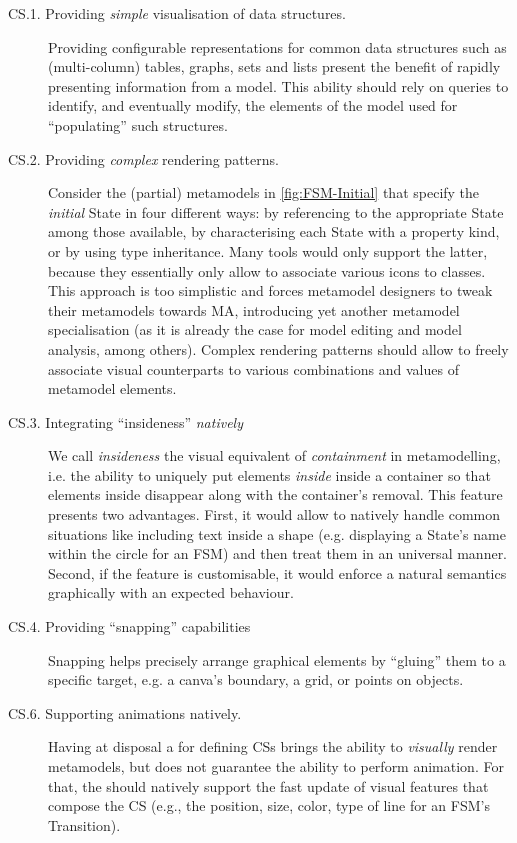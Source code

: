 \begin{description}
   \item[CS.1. Providing \emph{simple} visualisation of data struc\-tures.]
   Pro\-vi\-ding configurable representations for common data structures such as
   (multi-column) tables, graphs, sets and lists present the benefit of rapidly
   presenting information from a model. This ability should rely on queries to
   identify, and eventually modify, the elements of the model used for ``populating''
   such structures. 

	\item[CS.2. Providing \emph{complex} rendering patterns.]
   Consider the (partial) meta\-models in \autoref{fig:FSM-Initial} that
   specify the \emph{initial} \textsf{State} in four different ways: by referencing
   to the appropriate \textsf{State} among those available, by characterising each \textsf{State} with
   a property \textsf{kind}, or by using type inheritance. Many tools would only
   support the latter, because they essentially only allow to 
   associate various icons to classes. This approach is too simplistic and forces
   metamodel designers to tweak their metamodels towards MA, introducing yet another
   metamodel specialisation (as it is already the case for model editing and
   model analysis, among others). Complex rendering patterns should allow to freely
   associate visual counterparts to various combinations and values of metamodel
   elements.
   
   \item[CS.3. Integrating ``insideness'' \emph{natively}] We call \emph{insideness}
   the visual equivalent of \emph{containment} in metamodelling, i.e. the ability
   to uniquely put elements \emph{inside} inside a container so that elements 
   inside disappear along with the container's removal. This feature presents two
   advantages. First, it would allow to natively handle common situations like 
   including text inside a shape (e.g. displaying a \textsf{State}'s name within
   the circle for an \textsf{FSM}) and then treat them in an universal manner. 
   Second, if the feature is customisable, it would enforce a natural semantics
   graphically with an expected behaviour. 
   
   \item[CS.4. Providing ``snapping'' capabilities] Snapping helps precise\-ly arrange
   graphical elements by ``gluing'' them to a specific target, e.g. a canva's
   boundary, a grid, or points on objects. 
      
   \item[CS.6. Supporting animations natively.] Having at disposal a \DSL
   for defining CSs brings the ability to \emph{visually} render metamodels, but
   does not guarantee the ability to perform animation. For that, the \DSL should
   natively support the fast update of visual features that compose the CS (e.g.,
   the position, size, color, type of line for an \textsf{FSM}'s 
   \textsf{Transition}).      
\end{description}


